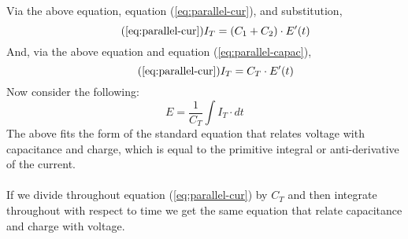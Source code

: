 \documentclass{article}
\begin{document}
	Via the above equation, equation (\ref{eq:parallel-cur}), and substitution,
	\begin{equation}\tag{\ref{eq:parallel-cur}}
		I_T = (C_1  + C_2) \cdot E'(t)
	\end{equation}
	And, via the above equation and equation (\ref{eq:parallel-capac}),
	\begin{equation}\tag{\ref{eq:parallel-cur}}
		I_T = C_T \cdot E'(t)
	\end{equation}
	Now consider the following:
	$$ E = \frac{1}{C_T} \int I_T \cdot dt$$
	The above fits the form of the standard equation that relates voltage with 
	capacitance and charge, which is equal to the primitive integral or 
	anti-derivative of the current. \\ \\
	If we divide throughout equation (\ref{eq:parallel-cur}) by $C_T$ and then 
	integrate throughout with respect to time we get the same equation that 
	relate capacitance and charge with voltage.
\end{document}
